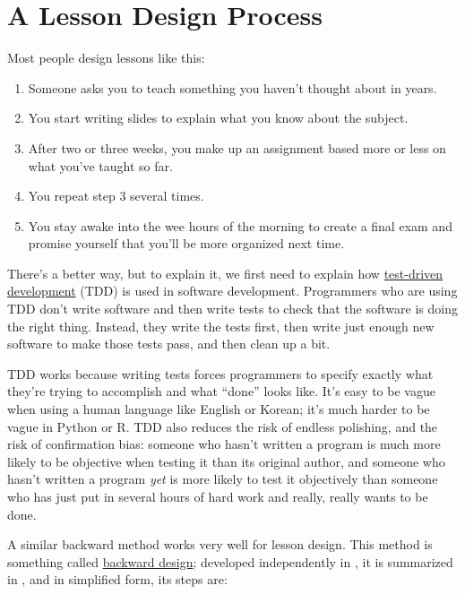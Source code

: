 \chapter{A Lesson Design Process}\label{s:process}

Most people design lessons like this:

\begin{enumerate}
\item
  Someone asks you to teach something you haven't thought about in
  years.
\item
  You start writing slides to explain what you know about the subject.
\item
  After two or three weeks, you make up an assignment based more or
  less on what you've taught so far.
\item
  You repeat step 3 several times.
\item
  You stay awake into the wee hours of the morning to create a final
  exam and promise yourself that you'll be more organized next time.
\end{enumerate}

There's a better way, but to explain it, we first need to explain how
\protect\hyperlink{g:test-driven-development}{test-driven development} (TDD)
is used in software development. Programmers who are using TDD don't
write software and then write tests to check that the software is
doing the right thing. Instead, they write the tests first, then write
just enough new software to make those tests pass, and then clean up a
bit.

TDD works because writing tests forces programmers to specify exactly
what they're trying to accomplish and what ``done'' looks like. It's
easy to be vague when using a human language like English or Korean;
it's much harder to be vague in Python or R. TDD also reduces the risk
of endless polishing, and the risk of confirmation bias: someone who
hasn't written a program is much more likely to be objective when
testing it than its original author, and someone who hasn't written a
program \emph{yet} is more likely to test it objectively than someone who
has just put in several hours of hard work and really, really wants to
be done.

A similar backward method works very well for lesson design. This
method is something called \protect\hyperlink{g:backward-design}{backward design};
developed independently in
\cite{Wigg2005,Bigg2011,Fink2013}, it is
summarized in \cite{McTi2013}, and in simplified form, its steps
are:

